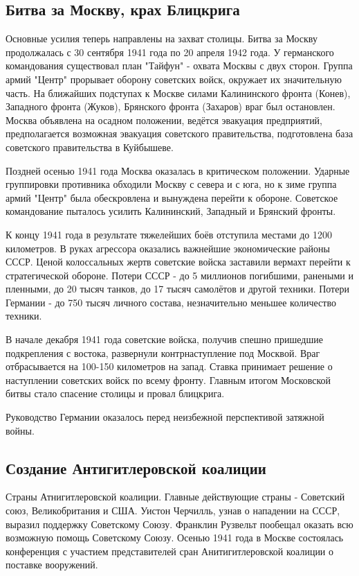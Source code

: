 \subsection{Битва за Москву, крах Блицкрига}

Основные усилия теперь направлены на захват столицы. Битва за Москву продолжалась с 30 сентября 1941 года по 20 апреля 1942 года. У германского командования существовал план "Тайфун" - охвата Москвы с двух сторон. Группа армий "Центр" прорывает оборону советских войск, окружает их значительную часть. На ближайших подступах к Москве силами Калининского фронта (Конев), Западного фронта (Жуков), Брянского фронта (Захаров) враг был остановлен. Москва объявлена на осадном положении, ведётся эвакуация предприятий, предполагается возможная эвакуация советского правительства, подготовлена база советского правительства в Куйбышеве.

Поздней осенью 1941 года Москва оказалась в критическом положении. Ударные группировки противника обходили Москву с севера и с юга, но к зиме группа армий "Центр" была обескровлена и вынуждена перейти к обороне. Советское командование пыталось усилить Калининский, Западный и Брянский фронты.

К концу 1941 года в результате тяжелейших боёв отступила местами до 1200 километров. В руках агрессора оказались важнейшие экономические районы СССР. Ценой колоссальных жертв советские войска заставили вермахт перейти к стратегической обороне. Потери СССР - до 5 миллионов погибшими, ранеными и пленными, до 20 тысяч танков, до 17 тысяч самолётов и другой техники. Потери Германии - до 750 тысяч личного состава, незначительно меньшее количество техники.

В начале декабря 1941 года советские войска, получив спешно пришедшие подкрепления с востока, развернули контрнаступление под Москвой. Враг отбрасывается на 100-150 километров на запад. Ставка принимает решение о наступлении советских войск по всему фронту. Главным итогом Московской битвы стало спасение столицы и провал блицкрига.

Руководство Германии оказалось перед неизбежной перспективой затяжной войны.

\subsection{Создание Антигитлеровской коалиции}
Страны Атнигитлеровской коалиции. Главные действующие страны - Советский союз, Великобритания и США. Уистон Черчилль, узнав о нападении на СССР, выразил поддержку Советскому Союзу. Франклин Рузвельт пообещал оказать всю возможную помощь Советскому Союзу. Осенью 1941 года в Москве состоялась конференция с участием представителей сран Анитигитлеровской коалиции о поставке вооружений.

